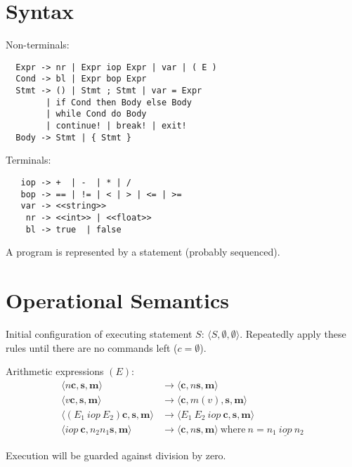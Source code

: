 \documentclass[11pt]{report}
\begin{document}
\thispagestyle{empty}
\section*{Syntax}

Non-terminals:
  \begin{lstlisting}
  Expr -> nr | Expr iop Expr | var | ( E )
  Cond -> bl | Expr bop Expr 
  Stmt -> () | Stmt ; Stmt | var = Expr
        | if Cond then Body else Body
        | while Cond do Body
        | continue! | break! | exit!
  Body -> Stmt | { Stmt }
  \end{lstlisting}

\vspace{3em}
\noindent Terminals:
    \begin{lstlisting}
   iop -> +  | -  | * | /
   bop -> == | != | < | > | <= | >=
   var -> <<string>>
    nr -> <<int>> | <<float>>
    bl -> true  | false
  \end{lstlisting}


\noindent A program is represented by a statement (probably sequenced).




\newpage
\section*{Operational Semantics}

Initial configuration of executing statement $S$: $ \langle S, \emptyset, \emptyset \rangle $. Repeatedly apply these rules until there are no commands left ($c=\emptyset$).

\vspace{2em}
\noindent Arithmetic expressions $(E)$:
\begin{align*}
\langle n  \bm{c},  \bm{s},  \bm{m} \rangle  &\rightarrow   \langle  \bm{c}, n  \bm{s},  \bm{m} \rangle \\
\langle v  \bm{c},  \bm{s},  \bm{m} \rangle    &\rightarrow   \langle  \bm{c},  m(v),  \bm{s},  \bm{m} \rangle \\
\langle (E_1\ iop \ E_2)  \bm{c},  \bm{s},  \bm{m} \rangle    &\rightarrow   \langle E_1\  E_2\  iop  \ \bm{c},  \bm{s},  \bm{m} \rangle \\
\langle iop \ \bm{c}, n_2 n_1  \bm{s},  \bm{m} \rangle    &\rightarrow   \langle  \bm{c}, n  \bm{s},  \bm{m} \rangle  \ \text{where} \ n = n_1\ \underline{iop} \ n_2
\end{align*}

Execution will be guarded against division by zero.
\end{document}
